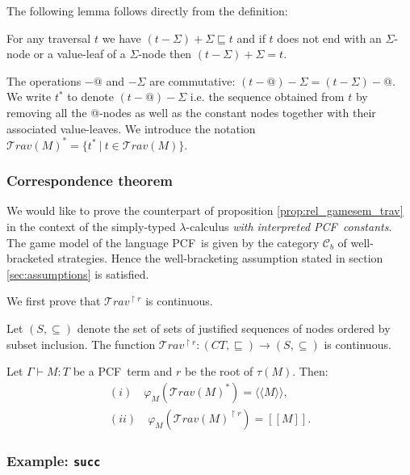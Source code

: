 \documentclass{llncs}
\newcommand\travset{\mathcal{T}rav}
\newcommand{\lsem}{[\![} %
\newcommand{\rsem}{]\!]} %
\newcommand{\sem}[1]{{\lsem #1 \rsem}}
\newcommand{\intersem}[1]{{\langle\!\langle #1 \rangle\!\rangle}}
\newcommand\pcf{\textsf{PCF}}
\newcommand\pcfsucc{\texttt{succ}}
\begin{document}
The following lemma follows directly from the definition:
\begin{lemma}
\label{lem:minus_sig_plus_sig} For any traversal $t$ we have
$(t-\Sigma)+\Sigma \sqsubseteq t$ and if $t$ does not end with an
$\Sigma$-node or a value-leaf of a $\Sigma$-node then
$(t-\Sigma)+\Sigma = t$.
\end{lemma}

The operations $-@$ and $-\Sigma$ are commutative: $(t-@)-\Sigma =
(t-\Sigma)-@$. We write $t^*$ to denote $(t-@)-\Sigma$ i.e. the
sequence obtained from $t$ by removing all the @-nodes as well as
the constant nodes together with their associated value-leaves. We
introduce the notation $\travset(M)^{*} = \{ t^* \ | \  t \in
\travset(M) \}$.

\subsubsection{Correspondence theorem}
We would like to prove the counterpart of proposition
\ref{prop:rel_gamesem_trav} in the context of the simply-typed
$\lambda$-calculus \emph{with interpreted \pcf\ constants}. The game
model of the language \pcf\ is given by the category $\mathcal{C}_b$
of well-bracketed strategies. Hence the well-bracketing assumption
stated in section \ref{sec:assumptions} is satisfied.

We first prove that $\travset^{\upharpoonright r}$ is continuous.
\begin{lemma}
\label{lem:travred_continuous} Let $(S,\subseteq)$ denote the set of
sets of justified sequences of nodes ordered by subset inclusion.
The function $\travset^{\upharpoonright r} : (CT,\sqsubseteq)
\rightarrow (S,\subseteq)$ is continuous.
\end{lemma}


\begin{proposition}
Let $\Gamma \vdash M : T$ be a \pcf\ term and $r$ be the root of
$\tau(M)$. Then:
\begin{align*}
(i)  \quad\varphi_M(\travset(M)^*) = \intersem{M},  \\
(ii) \quad \varphi_M(\travset(M)^{\upharpoonright r}) = \sem{M}.
\end{align*}
\end{proposition}


\subsubsection{Example: \pcfsucc}
\end{document}
